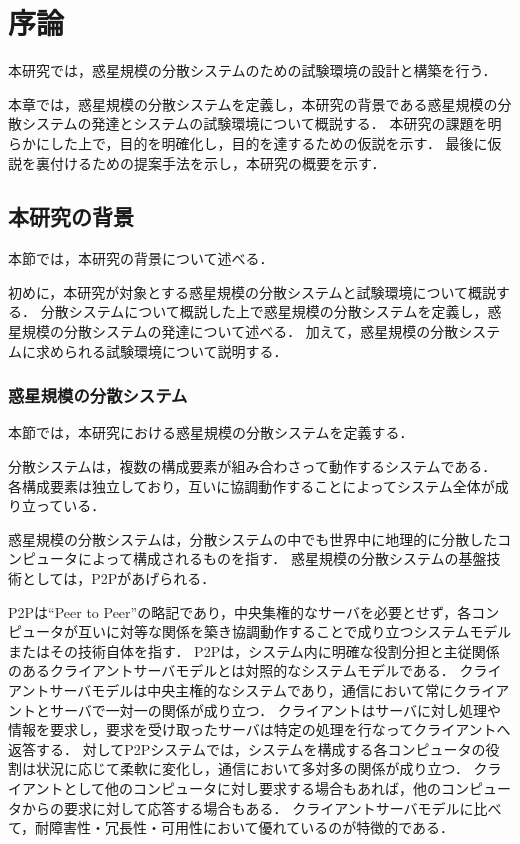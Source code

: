 \chapter{序論}
\label{introduction}

本研究では，惑星規模の分散システムのための試験環境の設計と構築を行う．

本章では，惑星規模の分散システムを定義し，本研究の背景である惑星規模の分散システムの発達とシステムの試験環境について概説する．
本研究の課題を明らかにした上で，目的を明確化し，目的を達するための仮説を示す．
最後に仮説を裏付けるための提案手法を示し，本研究の概要を示す．

\section{本研究の背景}
\label{introduction:background}

本節では，本研究の背景について述べる．

初めに，本研究が対象とする惑星規模の分散システムと試験環境について概説する．
分散システムについて概説した上で惑星規模の分散システムを定義し，惑星規模の分散システムの発達について述べる．
加えて，惑星規模の分散システムに求められる試験環境について説明する．

\subsection{惑星規模の分散システム}

本節では，本研究における惑星規模の分散システムを定義する．

分散システムは，複数の構成要素が組み合わさって動作するシステムである．
各構成要素は独立しており，互いに協調動作することによってシステム全体が成り立っている．

惑星規模の分散システムは，分散システムの中でも世界中に地理的に分散したコンピュータによって構成されるものを指す．
惑星規模の分散システムの基盤技術としては，P2Pがあげられる．

P2Pは``Peer to Peer''の略記であり，中央集権的なサーバを必要とせず，各コンピュータが互いに対等な関係を築き協調動作することで成り立つシステムモデルまたはその技術自体を指す．
P2Pは，システム内に明確な役割分担と主従関係のあるクライアントサーバモデルとは対照的なシステムモデルである．
クライアントサーバモデルは中央主権的なシステムであり，通信において常にクライアントとサーバで一対一の関係が成り立つ．
クライアントはサーバに対し処理や情報を要求し，要求を受け取ったサーバは特定の処理を行なってクライアントへ返答する．
対してP2Pシステムでは，システムを構成する各コンピュータの役割は状況に応じて柔軟に変化し，通信において多対多の関係が成り立つ．
クライアントとして他のコンピュータに対し要求する場合もあれば，他のコンピュータからの要求に対して応答する場合もある．
クライアントサーバモデルに比べて，耐障害性・冗長性・可用性において優れているのが特徴的である．

